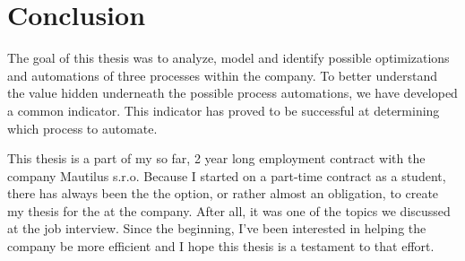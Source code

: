 \documentclass[12pt,oneside]{fithesis2}
\begin{document}
\chapter{Conclusion}
The goal of this thesis was to analyze, model and identify possible optimizations and automations of three processes within the company. To better understand the value hidden underneath the possible process automations, we have developed a common indicator. This indicator has proved to be successful at determining which process to automate.

This thesis is a part of my so far, 2 year long employment contract with the company Mautilus s.r.o. Because I started on a part-time contract as a student, there has always been the the option, or rather almost an obligation, to create my thesis for the at the company. After all, it was one of the topics we discussed at the job interview. Since the beginning, I've been interested in helping the company be more efficient and I hope this thesis is a testament to that effort.
\printbibliography
\listoffigures
\end{document}
